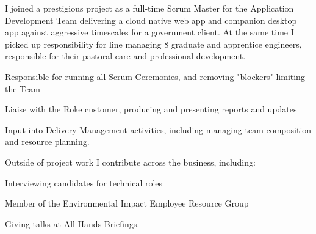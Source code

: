 \sectionsep
{}
I joined a prestigious project as a full-time Scrum Master for the Application Development Team delivering a cloud native web app and companion desktop app against aggressive timescales for a government client.
At the same time I picked up responsibility for line managing 8 graduate and apprentice engineers, responsible for their pastoral care and professional development.
\vspace{0.25em}
\begin{tightemize}
  \item Responsible for running all Scrum Ceremonies, and removing "blockers" limiting the Team
  \item Liaise with the Roke customer, producing and presenting reports and updates
  \item Input into Delivery Management activities, including managing team composition and resource planning.
\end{tightemize}

\vspace{0.5em}
Outside of project work I contribute across the business, including:
\begin{tightemize}
    \item Interviewing candidates for technical roles
    \item Member of the Environmental Impact Employee Resource Group
    \item Giving talks at All Hands Briefings.
\end{tightemize}

\sectionsep
